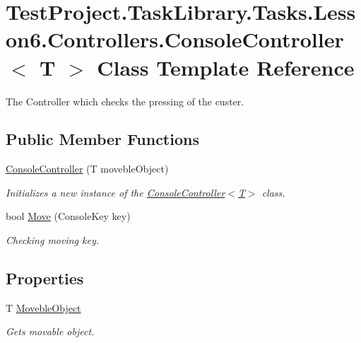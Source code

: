 \hypertarget{class_test_project_1_1_task_library_1_1_tasks_1_1_lesson6_1_1_controllers_1_1_console_controller}{}\section{Test\+Project.\+Task\+Library.\+Tasks.\+Lesson6.\+Controllers.\+Console\+Controller$<$ T $>$ Class Template Reference}
\label{class_test_project_1_1_task_library_1_1_tasks_1_1_lesson6_1_1_controllers_1_1_console_controller}


The Controller which checks the pressing of the custer.  


\subsection*{Public Member Functions}
\begin{DoxyCompactItemize}
\item 
\mbox{\hyperlink{class_test_project_1_1_task_library_1_1_tasks_1_1_lesson6_1_1_controllers_1_1_console_controller_abe440b796b1574349a0d21652b9442b0}{Console\+Controller}} (T moveble\+Object)
\begin{DoxyCompactList}\small\item\em Initializes a new instance of the \mbox{\hyperlink{class_test_project_1_1_task_library_1_1_tasks_1_1_lesson6_1_1_controllers_1_1_console_controller_abe440b796b1574349a0d21652b9442b0}{Console\+Controller$<$\+T$>$}} class. \end{DoxyCompactList}\item 
bool \mbox{\hyperlink{class_test_project_1_1_task_library_1_1_tasks_1_1_lesson6_1_1_controllers_1_1_console_controller_aa3d135155e9e718748be0eb0f8d2f433}{Move}} (Console\+Key key)
\begin{DoxyCompactList}\small\item\em Checking moving key. \end{DoxyCompactList}\end{DoxyCompactItemize}
\subsection*{Properties}
\begin{DoxyCompactItemize}
\item 
T \mbox{\hyperlink{class_test_project_1_1_task_library_1_1_tasks_1_1_lesson6_1_1_controllers_1_1_console_controller_ae2fe94c44b43a6acc44c883581232c47}{Moveble\+Object}}
\begin{DoxyCompactList}\small\item\em Gets movable object. \end{DoxyCompactList}\end{DoxyCompactItemize}


